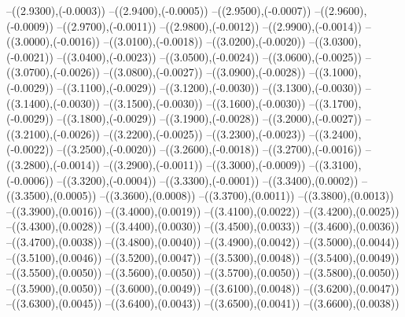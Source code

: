 {	--({\sx*(2.9300)},{\sy*(-0.0003)})
	--({\sx*(2.9400)},{\sy*(-0.0005)})
	--({\sx*(2.9500)},{\sy*(-0.0007)})
	--({\sx*(2.9600)},{\sy*(-0.0009)})
	--({\sx*(2.9700)},{\sy*(-0.0011)})
	--({\sx*(2.9800)},{\sy*(-0.0012)})
	--({\sx*(2.9900)},{\sy*(-0.0014)})
	--({\sx*(3.0000)},{\sy*(-0.0016)})
	--({\sx*(3.0100)},{\sy*(-0.0018)})
	--({\sx*(3.0200)},{\sy*(-0.0020)})
	--({\sx*(3.0300)},{\sy*(-0.0021)})
	--({\sx*(3.0400)},{\sy*(-0.0023)})
	--({\sx*(3.0500)},{\sy*(-0.0024)})
	--({\sx*(3.0600)},{\sy*(-0.0025)})
	--({\sx*(3.0700)},{\sy*(-0.0026)})
	--({\sx*(3.0800)},{\sy*(-0.0027)})
	--({\sx*(3.0900)},{\sy*(-0.0028)})
	--({\sx*(3.1000)},{\sy*(-0.0029)})
	--({\sx*(3.1100)},{\sy*(-0.0029)})
	--({\sx*(3.1200)},{\sy*(-0.0030)})
	--({\sx*(3.1300)},{\sy*(-0.0030)})
	--({\sx*(3.1400)},{\sy*(-0.0030)})
	--({\sx*(3.1500)},{\sy*(-0.0030)})
	--({\sx*(3.1600)},{\sy*(-0.0030)})
	--({\sx*(3.1700)},{\sy*(-0.0029)})
	--({\sx*(3.1800)},{\sy*(-0.0029)})
	--({\sx*(3.1900)},{\sy*(-0.0028)})
	--({\sx*(3.2000)},{\sy*(-0.0027)})
	--({\sx*(3.2100)},{\sy*(-0.0026)})
	--({\sx*(3.2200)},{\sy*(-0.0025)})
	--({\sx*(3.2300)},{\sy*(-0.0023)})
	--({\sx*(3.2400)},{\sy*(-0.0022)})
	--({\sx*(3.2500)},{\sy*(-0.0020)})
	--({\sx*(3.2600)},{\sy*(-0.0018)})
	--({\sx*(3.2700)},{\sy*(-0.0016)})
	--({\sx*(3.2800)},{\sy*(-0.0014)})
	--({\sx*(3.2900)},{\sy*(-0.0011)})
	--({\sx*(3.3000)},{\sy*(-0.0009)})
	--({\sx*(3.3100)},{\sy*(-0.0006)})
	--({\sx*(3.3200)},{\sy*(-0.0004)})
	--({\sx*(3.3300)},{\sy*(-0.0001)})
	--({\sx*(3.3400)},{\sy*(0.0002)})
	--({\sx*(3.3500)},{\sy*(0.0005)})
	--({\sx*(3.3600)},{\sy*(0.0008)})
	--({\sx*(3.3700)},{\sy*(0.0011)})
	--({\sx*(3.3800)},{\sy*(0.0013)})
	--({\sx*(3.3900)},{\sy*(0.0016)})
	--({\sx*(3.4000)},{\sy*(0.0019)})
	--({\sx*(3.4100)},{\sy*(0.0022)})
	--({\sx*(3.4200)},{\sy*(0.0025)})
	--({\sx*(3.4300)},{\sy*(0.0028)})
	--({\sx*(3.4400)},{\sy*(0.0030)})
	--({\sx*(3.4500)},{\sy*(0.0033)})
	--({\sx*(3.4600)},{\sy*(0.0036)})
	--({\sx*(3.4700)},{\sy*(0.0038)})
	--({\sx*(3.4800)},{\sy*(0.0040)})
	--({\sx*(3.4900)},{\sy*(0.0042)})
	--({\sx*(3.5000)},{\sy*(0.0044)})
	--({\sx*(3.5100)},{\sy*(0.0046)})
	--({\sx*(3.5200)},{\sy*(0.0047)})
	--({\sx*(3.5300)},{\sy*(0.0048)})
	--({\sx*(3.5400)},{\sy*(0.0049)})
	--({\sx*(3.5500)},{\sy*(0.0050)})
	--({\sx*(3.5600)},{\sy*(0.0050)})
	--({\sx*(3.5700)},{\sy*(0.0050)})
	--({\sx*(3.5800)},{\sy*(0.0050)})
	--({\sx*(3.5900)},{\sy*(0.0050)})
	--({\sx*(3.6000)},{\sy*(0.0049)})
	--({\sx*(3.6100)},{\sy*(0.0048)})
	--({\sx*(3.6200)},{\sy*(0.0047)})
	--({\sx*(3.6300)},{\sy*(0.0045)})
	--({\sx*(3.6400)},{\sy*(0.0043)})
	--({\sx*(3.6500)},{\sy*(0.0041)})
	--({\sx*(3.6600)},{\sy*(0.0038)})
}
